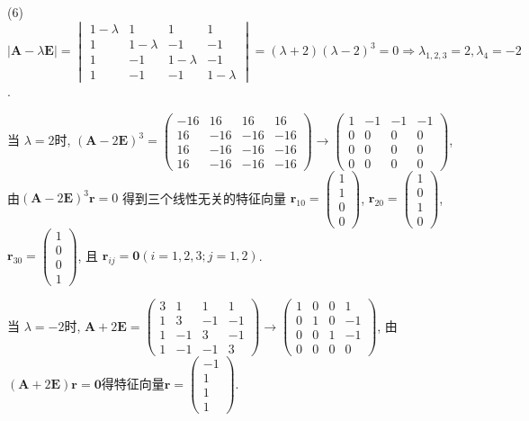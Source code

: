 \begin{solution}
  (6) $|\bm{A}-\lambda\bm{E}|=\begin{vmatrix}1-\lambda&1&1&1\\1&1-\lambda&-1&-1\\1&-1&1-\lambda&-1\\1&-1&-1&1-\lambda\end{vmatrix}=(\lambda+2)(\lambda-2)^3=0\Rightarrow\lambda_{1,2,3}=2,\lambda_4=-2$.

  当 $\lambda=2$时, $(\bm{A}-2\bm{E})^3=\begin{pmatrix}-16&16&16&16\\16&-16&-16&-16\\16&-16&-16&-16\\16&-16&-16&-16\end{pmatrix}\to\begin{pmatrix}1&-1&-1&-1\\0&0&0&0\\0&0&0&0\\0&0&0&0\end{pmatrix}$, 由$(\bm{A}-2\bm{E})^3\bm{r}=0$
  得到三个线性无关的特征向量 $\bm{r}_{10}=\begin{pmatrix}1\\1\\0\\0\end{pmatrix}$,
  $\bm{r}_{20}=\begin{pmatrix}1\\0\\1\\0\end{pmatrix}$,
  $\bm{r}_{30}=\begin{pmatrix}1\\0\\0\\1\end{pmatrix}$, 	
  且 $\bm{r}_{ij}=\bm{0}(i=1,2,3;j=1,2)$.

  当 $\lambda=-2$时, $\bm{A}+2\bm{E}=\begin{pmatrix}3&1&1&1\\1&3&-1&-1\\1&-1&3&-1\\1&-1&-1&3\end{pmatrix}\to\begin{pmatrix}1&0&0&1\\0&1&0&-1\\0&0&1&-1\\0&0&0&0\end{pmatrix}$, 
  由 $(\bm{A}+2\bm{E})\bm{r}=\bm{0}$得特征向量$\bm{r}=\begin{pmatrix}-1\\1\\1\\1\end{pmatrix}$.


\end{solution}
